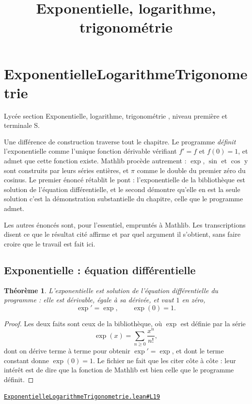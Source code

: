 \documentclass[11pt,a4paper]{article}
\title{Exponentielle, logarithme, trigonométrie}
\date{}
\theoremstyle{definition}
\theoremstyle{plain}
\newtheorem{theoreme}{Théorème}
\newcommand{\source}[2]{\par\smallskip\noindent\hfill{\footnotesize\href{#1}{\texttt{#2}}}\par\smallskip}
\begin{document}
\maketitle
\sloppy

\section{ExponentielleLogarithmeTrigonometrie}

\noindent
Lycée \textemdash{} section \og{} Exponentielle, logarithme, trigonométrie \fg{}, niveau
première et terminale S.

\medskip\noindent
Une différence de construction traverse tout le chapitre. Le programme \emph{définit}
l'exponentielle comme l'unique fonction dérivable vérifiant $f' = f$ et $f(0) = 1$, et
admet que cette fonction existe. Mathlib procède autrement : $\exp$, $\sin$ et $\cos$ y
sont construits par leurs séries entières, et $\pi$ comme le double du premier zéro du
cosinus. Le premier énoncé rétablit le pont : l'exponentielle de la bibliothèque est
solution de l'équation différentielle, et le second démontre qu'elle en est la seule
solution \textemdash{} c'est la démonstration substantielle du chapitre, celle que le
programme admet.

\medskip\noindent
Les autres énoncés sont, pour l'essentiel, empruntés à Mathlib. Les transcriptions disent
ce que le résultat cité affirme et par quel argument il s'obtient, sans faire croire que le
travail est fait ici.

\subsection{Exponentielle : équation différentielle}

\begin{theoreme}
L'exponentielle est solution de l'équation différentielle du programme : elle est
dérivable, égale à sa dérivée, et vaut $1$ en zéro,
\[ \exp' = \exp, \qquad \exp(0) = 1 . \]
\end{theoreme}

\begin{proof}
Les deux faits sont ceux de la bibliothèque, où $\exp$ est définie par la série
\[ \exp(x) = \sum_{n \ge 0} \frac{x^{n}}{n!} , \]
dont on dérive terme à terme pour obtenir $\exp' = \exp$, et dont le terme constant donne
$\exp(0) = 1$. Le fichier ne fait que les citer côte à côte : leur intérêt est de dire que
la fonction de Mathlib est bien celle que le programme définit.
\end{proof}
\source{https://github.com/Commutator-IO/learn-lean/blob/main/cours/02-lycee/05-exponentielle-logarithme-trigonometrie/ExponentielleLogarithmeTrigonometrie.lean\#L19}{ExponentielleLogarithmeTrigonometrie.lean\#L19}
\end{document}

